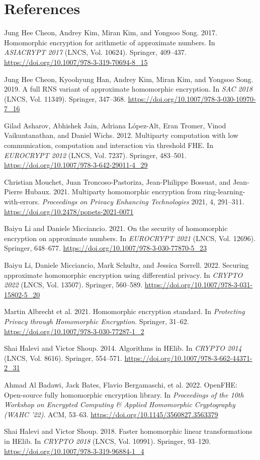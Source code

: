 \documentclass[11pt]{article}
\begin{document}
\section*{References}
\footnotesize
\begin{enumerate}[label={[\arabic*]},leftmargin=*,itemsep=1pt]
\item Jung Hee Cheon, Andrey Kim, Miran Kim, and Yongsoo Song. 2017. Homomorphic encryption for arithmetic of approximate numbers. In \emph{ASIACRYPT 2017} (LNCS, Vol. 10624). Springer, 409--437. \url{https://doi.org/10.1007/978-3-319-70694-8_15}
\item Jung Hee Cheon, Kyoohyung Han, Andrey Kim, Miran Kim, and Yongsoo Song. 2019. A full RNS variant of approximate homomorphic encryption. In \emph{SAC 2018} (LNCS, Vol. 11349). Springer, 347--368. \url{https://doi.org/10.1007/978-3-030-10970-7_16}
\item Gilad Asharov, Abhishek Jain, Adriana L\'opez-Alt, Eran Tromer, Vinod Vaikuntanathan, and Daniel Wichs. 2012. Multiparty computation with low communication, computation and interaction via threshold FHE. In \emph{EUROCRYPT 2012} (LNCS, Vol. 7237). Springer, 483--501. \url{https://doi.org/10.1007/978-3-642-29011-4_29}
\item Christian Mouchet, Juan Troncoso-Pastoriza, Jean-Philippe Bossuat, and Jean-Pierre Hubaux. 2021. Multiparty homomorphic encryption from ring-learning-with-errors. \emph{Proceedings on Privacy Enhancing Technologies} 2021, 4, 291--311. \url{https://doi.org/10.2478/popets-2021-0071}
\item Baiyu Li and Daniele Micciancio. 2021. On the security of homomorphic encryption on approximate numbers. In \emph{EUROCRYPT 2021} (LNCS, Vol. 12696). Springer, 648--677. \url{https://doi.org/10.1007/978-3-030-77870-5_23}
\item Baiyu Li, Daniele Micciancio, Mark Schultz, and Jessica Sorrell. 2022. Securing approximate homomorphic encryption using differential privacy. In \emph{CRYPTO 2022} (LNCS, Vol. 13507). Springer, 560--589. \url{https://doi.org/10.1007/978-3-031-15802-5_20}
\item Martin Albrecht et al. 2021. Homomorphic encryption standard. In \emph{Protecting Privacy through Homomorphic Encryption}. Springer, 31--62. \url{https://doi.org/10.1007/978-3-030-77287-1_2}
\item Shai Halevi and Victor Shoup. 2014. Algorithms in HElib. In \emph{CRYPTO 2014} (LNCS, Vol. 8616). Springer, 554--571. \url{https://doi.org/10.1007/978-3-662-44371-2_31}
\item Ahmad Al Badawi, Jack Bates, Flavio Bergamaschi, et al. 2022. OpenFHE: Open-source fully homomorphic encryption library. In \emph{Proceedings of the 10th Workshop on Encrypted Computing \& Applied Homomorphic Cryptography (WAHC '22)}. ACM, 53--63. \url{https://doi.org/10.1145/3560827.3563379}
\item Shai Halevi and Victor Shoup. 2018. Faster homomorphic linear transformations in HElib. In \emph{CRYPTO 2018} (LNCS, Vol. 10991). Springer, 93--120. \url{https://doi.org/10.1007/978-3-319-96884-1_4}
\end{enumerate}
\end{document}
